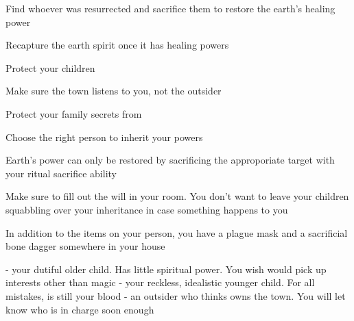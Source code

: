 \documentclass[char]{Pestilence}
\begin{document}
\begin{itemz}[Goals]
	\item Find whoever was resurrected and sacrifice them to restore the earth's healing power
	\item Recapture the earth spirit once it has healing powers
	\item Protect your children
	\item Make sure the town listens to you, not the outsider
	\item Protect your family secrets from \cOutsider{}
	\item Choose the right person to inherit your powers
\end{itemz} 

\begin{itemz}[Notes]
	\item Earth's power can only be restored by sacrificing the approporiate target with your ritual sacrifice ability
	\item Make sure to fill out the will in your room. You don't want to leave your children squabbling over your inheritance in case something happens to you
	\item In addition to the items on your person, you have a plague mask and a sacrificial bone dagger somewhere in your house
\end{itemz}

\begin{contacts}
	\contact{\cApprentice{}} - your dutiful older child. Has little spiritual power. You wish \cApprentice{\they} would pick up interests other than magic  
	\contact{\cRebel{}} - your reckless, idealistic younger child. For all \cRebel{\their} mistakes, \cRebel{\they} is still your blood 
	\contact{\cOutsider{}} - an outsider who thinks \cOutsider{\they} owns the town. You will let \cOutsider{\them} know who is in charge soon enough
\end{contacts}
\end{document}
